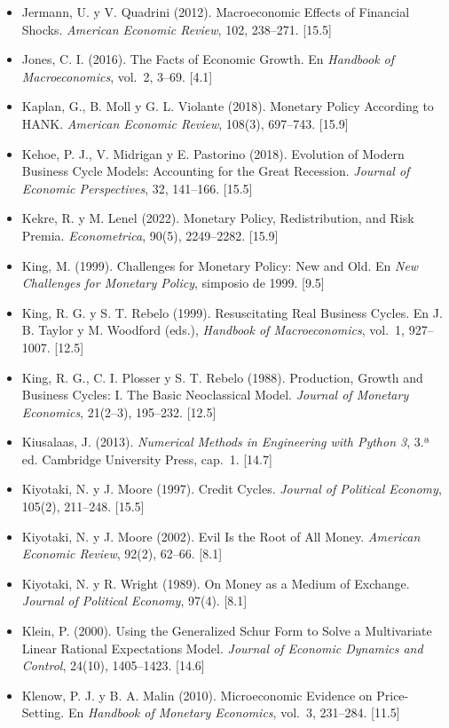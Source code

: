 \documentclass[11pt,a4paper]{article}
\begin{document}
{\begin{itemize}[leftmargin=1.4em,itemsep=1pt,label={}]
\item Jermann, U. y V. Quadrini (2012). Macroeconomic Effects of Financial Shocks. \emph{American Economic Review}, 102, 238--271. [15.5]
\item Jones, C. I. (2016). The Facts of Economic Growth. En \emph{Handbook of Macroeconomics}, vol.~2, 3--69. [4.1]
\item Kaplan, G., B. Moll y G. L. Violante (2018). Monetary Policy According to HANK. \emph{American Economic Review}, 108(3), 697--743. [15.9]
\item Kehoe, P. J., V. Midrigan y E. Pastorino (2018). Evolution of Modern Business Cycle Models: Accounting for the Great Recession. \emph{Journal of Economic Perspectives}, 32, 141--166. [15.5]
\item Kekre, R. y M. Lenel (2022). Monetary Policy, Redistribution, and Risk Premia. \emph{Econometrica}, 90(5), 2249--2282. [15.9]
\item King, M. (1999). Challenges for Monetary Policy: New and Old. En \emph{New Challenges for Monetary Policy}, simposio de 1999. [9.5]
\item King, R. G. y S. T. Rebelo (1999). Resuscitating Real Business Cycles. En J. B. Taylor y M. Woodford (eds.), \emph{Handbook of Macroeconomics}, vol.~1, 927--1007. [12.5]
\item King, R. G., C. I. Plosser y S. T. Rebelo (1988). Production, Growth and Business Cycles: I. The Basic Neoclassical Model. \emph{Journal of Monetary Economics}, 21(2--3), 195--232. [12.5]
\item Kiusalaas, J. (2013). \emph{Numerical Methods in Engineering with Python 3}, 3.ª ed. Cambridge University Press, cap.~1. [14.7]
\item Kiyotaki, N. y J. Moore (1997). Credit Cycles. \emph{Journal of Political Economy}, 105(2), 211--248. [15.5]
\item Kiyotaki, N. y J. Moore (2002). Evil Is the Root of All Money. \emph{American Economic Review}, 92(2), 62--66. [8.1]
\item Kiyotaki, N. y R. Wright (1989). On Money as a Medium of Exchange. \emph{Journal of Political Economy}, 97(4). [8.1]
\item Klein, P. (2000). Using the Generalized Schur Form to Solve a Multivariate Linear Rational Expectations Model. \emph{Journal of Economic Dynamics and Control}, 24(10), 1405--1423. [14.6]
\item Klenow, P. J. y B. A. Malin (2010). Microeconomic Evidence on Price-Setting. En \emph{Handbook of Monetary Economics}, vol.~3, 231--284. [11.5]

\end{itemize}}
\end{document}
